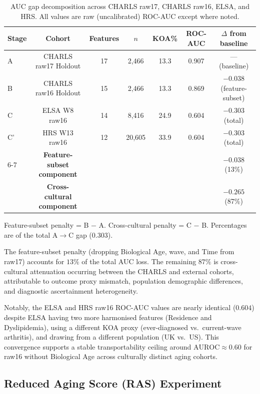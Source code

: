 \documentclass[11pt,a4paper]{article}
\begin{document}
\begin{table}[h!]
\centering
\small
\caption{AUC gap decomposition across CHARLS raw17, CHARLS raw16, ELSA, and HRS.
All values are raw (uncalibrated) ROC-AUC except where noted.}
\label{tab:auc-decomp}
\begin{tabular}{lcccccc}
\toprule
Stage & Cohort & Features & $n$ & KOA\% & ROC-AUC & $\Delta$ from baseline \\
\midrule
A  & CHARLS raw17 Holdout  & 17 & 2{,}466  & 13.3 & 0.907 & — (baseline) \\
B  & CHARLS raw16 Holdout  & 15 & 2{,}466  & 13.3 & 0.869 & $-0.038$ (feature-subset) \\
C  & ELSA W8 raw16         & 14 & 8{,}416  & 24.9 & 0.604 & $-0.303$ (total) \\
C' & HRS W13 raw16         & 12 & 20{,}605 & 33.9 & 0.604 & $-0.303$ (total) \\
\cmidrule{6-7}
   & \textbf{Feature-subset component}  & & & & & $\mathbf{-0.038}$ (13\%) \\
   & \textbf{Cross-cultural component}  & & & & & $\mathbf{-0.265}$ (87\%) \\
\bottomrule
\end{tabular}

\vspace{4pt}
\footnotesize{Feature-subset penalty = B $-$ A. Cross-cultural penalty = C $-$ B.
Percentages are of the total A$\rightarrow$C gap ($0.303$).}
\end{table}

The feature-subset penalty (dropping Biological Age, wave, and Time from raw17)
accounts for $13\%$ of the total AUC loss. The remaining $87\%$ is cross-cultural
attenuation occurring between the CHARLS and external cohorts, attributable to
outcome proxy mismatch, population demographic differences, and diagnostic
ascertainment heterogeneity.

Notably, the ELSA and HRS raw16 ROC-AUC values are nearly identical ($0.604$)
despite ELSA having two more harmonised features (Residence and Dyslipidemia),
using a different KOA proxy (ever-diagnosed vs.\ current-wave arthritis), and
drawing from a different population (UK vs.\ US). This convergence supports a
stable transportability ceiling around $\text{AUROC} \approx 0.60$ for raw16
without Biological Age across culturally distinct aging cohorts.

\subsection{Reduced Aging Score (RAS) Experiment}
\label{sec:ras-results}
\end{document}

